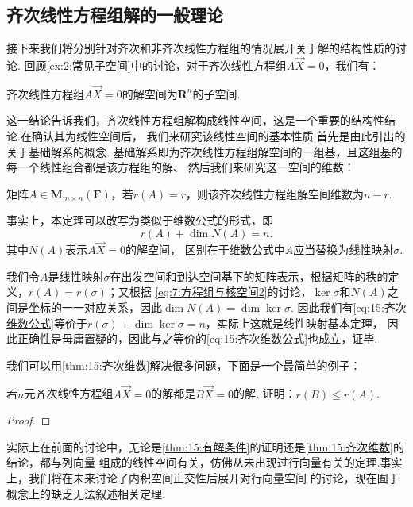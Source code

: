 \subsection{齐次线性方程组解的一般理论}
接下来我们将分别针对齐次和非齐次线性方程组的情况展开关于解的结构性质的讨论.
回顾\autoref{ex:2:常见子空间}中的讨论，对于齐次线性方程组$A\vec{X}=0$，我们有：
\begin{theorem}
    齐次线性方程组$A\vec{X}=0$的解空间为$\mathbf{R}^n$的子空间.
\end{theorem}
这一结论告诉我们，齐次线性方程组解构成线性空间，这是一个重要的结构性结论.在确认其为线性空间后，
我们来研究该线性空间的基本性质.首先是由此引出的关于基础解系的概念.
基础解系即为齐次线性方程组解空间的一组基，且这组基的每一个线性组合都是该方程组的解、
然后我们来研究这一空间的维数：
\begin{theorem}\label{thm:15:齐次维数}
    矩阵$A \in \mathbf{M}_{m \times n}(\mathbf{F})$，若$r(A) = r$，则该齐次线性方程组解空间维数为$n - r$.
\end{theorem}
事实上，本定理可以改写为类似于维数公式的形式，即
\begin{equation}\label{eq:15:齐次维数公式}
    r(A) + \dim N(A) = n.
\end{equation}
其中$N(A)$表示$A\vec{X}=0$的解空间，
区别在于维数公式中$A$应当替换为线性映射$\sigma$.

我们令$A$是线性映射$\sigma$在出发空间和到达空间基下的矩阵表示，根据矩阵的秩的定义，$r(A)=r(\sigma)$；又根据
\autoref{eq:7:方程组与核空间2}的讨论，$\ker\sigma$和$N(A)$之间是坐标的一一对应关系，因此$\dim N(A)=\dim\ker\sigma$.
因此我们有\autoref{eq:15:齐次维数公式}等价于$r(\sigma)+\dim\ker\sigma=n$，实际上这就是线性映射基本定理，
因此正确性是毋庸置疑的，因此与之等价的\autoref{eq:15:齐次维数公式}也成立，证毕.

我们可以用\autoref{thm:15:齐次维数}解决很多问题，下面是一个最简单的例子：
\begin{example}
    若$n$元齐次线性方程组$A\vec{X} = 0$的解都是$B\vec{X} = 0$的解. 证明：$r(B) \leqslant r(A)$.
\end{example}
\begin{proof}
    
\end{proof}

实际上在前面的讨论中，无论是\autoref{thm:15:有解条件}的证明还是\autoref{thm:15:齐次维数}的结论，都与列向量
组成的线性空间有关，仿佛从未出现过行向量有关的定理.事实上，我们将在未来讨论了内积空间正交性后展开对行向量空间
的讨论，现在囿于概念上的缺乏无法叙述相关定理.


